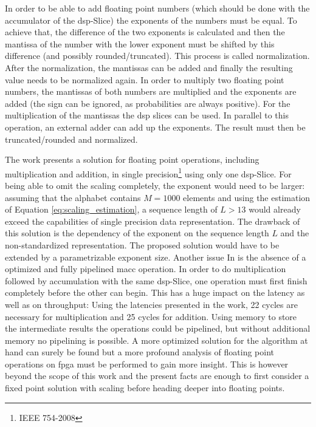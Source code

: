 \documentclass[mscthesis]{usiinfthesis}
\begin{document}
In order to be able to add floating point numbers (which should be done with the
accumulator of the \gls{dsp}-Slice) the exponents of the numbers must be equal.
To achieve that, the difference of the two exponents is calculated and then the
mantissa of the number with the lower exponent must be shifted by this
difference (and possibly rounded/truncated). This process is called
normalization. After the normalization, the mantissas can be added and finally
the resulting value needs to be normalized again. In order to multiply two
floating point numbers, the mantissas of both numbers are multiplied and the
exponents are added (the sign can be ignored, as probabilities are always
positive). For the multiplication of the mantissas the \gls{dsp} slices can be
used. In parallel to this operation, an external adder can add up the
exponents. The result must then be truncated/rounded and normalized.

The work \cite{FPL13_Brosser} presents a solution for floating point
operations, including multiplication and addition, in single
precision\footnote{IEEE 754-2008} using only one \gls{dsp}-Slice. For being
able to omit the scaling completely, the exponent would need to be larger:
assuming that the alphabet contains $M=1000$ elements and using the estimation
of Equation \ref{eq:scaling_estimation}, a sequence length of $L>13$ would
already exceed the capabilities of single precision data representation. The
drawback of this solution is the dependency of the exponent on the sequence
length $L$ and the non-standardized representation. The proposed solution would
have to be extended by a parametrizable exponent size. Another issue In
\cite{FPL13_Brosser} is the absence of a optimized and fully pipelined
\gls{macc} operation.  In order to do multiplication followed by accumulation
with the same \gls{dsp}-Slice, one operation must first finish completely
before the other can begin. This has a huge impact on the latency as well as on
throughput: Using the latencies presented in the work, 22 cycles are necessary
for multiplication and 25 cycles for addition. Using memory to store the
intermediate results the operations could be pipelined, but without additional
memory no pipelining is possible. A more optimized solution for the algorithm
at hand can surely be found but a more profound analysis of floating point
operations on \gls{fpga} must be performed to gain more insight. This is
however beyond the scope of this work and the present facts are enough to
first consider a fixed point solution with scaling before heading deeper into
floating points.
\end{document}
